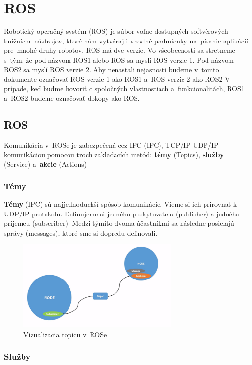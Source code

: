 \section{ROS}
\noindent Robotický operačný systém (\acrlong{ROS}) je súbor voľne dostupných softvérových knižníc a~nástrojov, ktoré nám vytvárajú
vhodné podmienky na~písanie aplikácií pre~mnohé druhy robotov. ROS má dve verzie. Vo všeobecnosti sa stretneme s~tým, že pod názvom
ROS1 alebo ROS sa myslí ROS verzie 1. Pod názvom ROS2 sa myslí ROS verzie 2. Aby nenastali nejasnosti budeme v~tomto dokumente
označovať ROS verzie 1 ako ROS1 a~ROS verzie 2 ako ROS2 V prípade, keď budme hovoriť o spoločných vlastnostiach a~funkcionalitách,
ROS1 a~ROS2 budeme označovať dokopy ako ROS.

\subsection{ROS}

\noindent Komunikácia v~ROSe je zabezpečená cez IPC (\acrlong{IPC}), TCP/IP UDP/IP komunikáciou pomocou troch zakladacích metód:
\textbf{témy} (Topics), \textbf{služby} (Service) a~\textbf{akcie} (Actions)

\subsubsection{Témy}

\textbf {Témy} (IPC) sú najjednoduchší spôsob komunikácie. Vieme si ich prirovnať k UDP/IP protokolu. Definujeme si jedného poskytovateľa (publisher)
a jedného príjemcu (subscriber). Medzi týmito dvoma účastníkmi sa následne posielajú správy (messages), ktoré sme si dopredu definovali.

\begin{figure}[h]
	\centering
	\includegraphics[width=8cm]{img/topicsExplanation.png}
	\caption{Vizualizacia topicu v~ROSe~\cite{RosDoc}}
	\label{fig:topics}
\end{figure}

\subsubsection{Služby}

